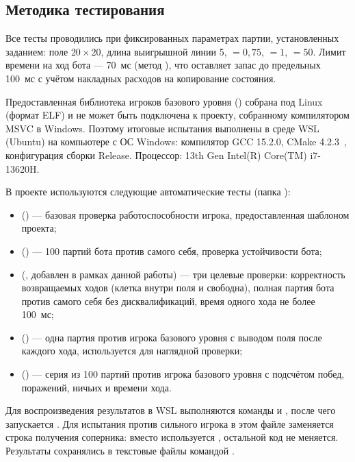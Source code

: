 \documentclass[14pt,a4paper]{extarticle}
\begin{document}
	\subsection{Методика тестирования}
	
	Все тесты проводились при фиксированных параметрах партии, установленных заданием: поле $20\times 20$, длина выигрышной линии 5,  $=0{,}75$,  $=1$,  $=50$. Лимит времени на ход бота --- 70~мс (метод ), что оставляет запас до предельных 100~мс с учётом накладных расходов на копирование состояния.
	
	Предоставленная библиотека игроков базового уровня () собрана под Linux (формат ELF) и не может быть подключена к проекту, собранному компилятором MSVC в Windows. Поэтому итоговые испытания выполнены в среде WSL (Ubuntu) на компьютере с ОС Windows: компилятор GCC 15.2.0, CMake 4.2.3~\cite{cmake}, конфигурация сборки Release. Процессор: 13th Gen Intel(R) Core(TM) i7-13620H.
	
	В проекте используются следующие автоматические тесты (папка ):
	\begin{itemize}
		\item {} () --- базовая проверка работоспособности игрока, предоставленная шаблоном проекта;
		\item {} () --- 100 партий бота против самого себя, проверка устойчивости бота;
		\item {} (, добавлен в рамках данной работы) --- три целевые проверки: корректность возвращаемых ходов (клетка внутри поля и свободна), полная партия бота против самого себя без дисквалификаций, время одного хода не более 100~мс;
		\item {} () --- одна партия против игрока базового уровня с выводом поля после каждого хода, используется для наглядной проверки;
		\item {} () --- серия из 100 партий против игрока базового уровня с подсчётом побед, поражений, ничьих и времени хода.
	\end{itemize}
	
	Для воспроизведения результатов в WSL выполняются команды  и , после чего запускается . Для испытания против сильного игрока в этом файле заменяется строка получения соперника: вместо  используется , остальной код не меняется. Результаты сохранялись в текстовые файлы командой .
	
\end{document}
